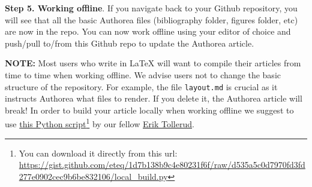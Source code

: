 \textbf{Step 5. Working offline}. If you navigate back to your Github repository, you will see that all the basic Authorea files (bibliography folder, figures folder, etc) are now in the repo. You can now work offline using your editor of choice and push/pull to/from this Github repo to update the Authorea article. 

\textbf{NOTE:} Most users who write in LaTeX will want to compile their articles from time to time when working offline. We advise users not to change the basic structure of the repository. For example, the file \verb|layout.md| is crucial as it instructs Authorea what files to render. If you delete it, the Authorea article will break! In order to build your article locally when working offline we suggest to use \href{https://gist.github.com/eteq/1d7b138b9c4e80231f6f}{this Python script}\footnote{You can download it directly from this url: \url{https://gist.github.com/eteq/1d7b138b9c4e80231f6f/raw/d535a5c0d7970fd3fd277e0902cec9b6be832106/local_build.py}} by our fellow \href{https://gist.github.com/eteq}{Erik Tollerud}. 